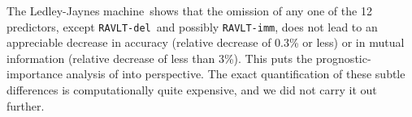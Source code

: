 \documentclass[utf8]{FrontiersinHarvard} %
\renewcommand*{\|}[1][]{\nonscript\:#1\vert\nonscript\:\mathopen{}}
\newcommand*{\ravltimm}{\texttt{RAVLT-imm}}
\newcommand*{\ravltdel}{\texttt{RAVLT-del}}
\newcommand*{\ad}{Alzheimer's Disease}
\newcommand*{\ljm}{Ledley-Jaynes machine}
\begin{document}
The \ljm\ shows that the omission of any one of the 12 predictors, except \ravltdel\ and possibly \ravltimm, does not lead to an appreciable decrease in accuracy (relative decrease of 0.3\% or less) or in mutual information (relative decrease of less than 3\%). This puts the prognostic-importance analysis of \citet{ryeetal2022} into perspective. The exact quantification of these subtle differences is computationally quite expensive, and we did not carry it out further.


\end{document}
